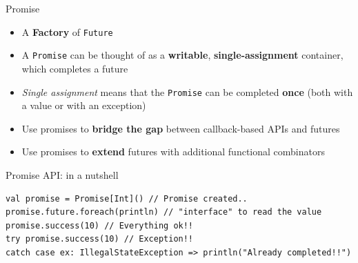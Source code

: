 \documentclass[presentation, 9pt]{beamer}\mode<presentation>{\usetheme{AMSBolognaFC}}
\begin{document}
\begin{frame}[fragile]{Promise}
\begin{itemize}
	\item A \textbf{Factory} of \texttt{Future}
	\item A \texttt{Promise} can be thought of as a \textbf{writable}, \textbf{single-assignment} container, which completes a future
  \item \emph{Single assignment} means that the \texttt{Promise} can be completed \textbf{once} (both with a value or with an exception)
  \item Use promises to \textbf{bridge the gap} between callback-based APIs and futures
  \item Use promises to \textbf{extend} futures with additional functional combinators
\end{itemize}
\begin{alertblock}{Promise API: in a nutshell}
	\begin{tcolorbox}[left=0pt, top=0pt, bottom=0pt]
		\begin{verbatim}
val promise = Promise[Int]() // Promise created..
promise.future.foreach(println) // "interface" to read the value
promise.success(10) // Everything ok!!
try promise.success(10) // Exception!!
catch case ex: IllegalStateException => println("Already completed!!")
		\end{verbatim}
	\end{tcolorbox}
\end{alertblock}
\end{frame}
\end{document}
